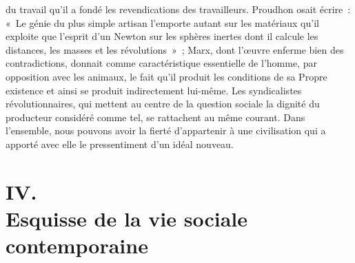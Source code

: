 \documentclass[french,twoside]{book} %
\begin{document}
du travail qu'il a fondé les revendications des travailleurs. Proudhon osait écrire : « Le génie du plus simple artisan l'emporte autant sur les matériaux qu'il exploite que l'esprit d'un Newton sur les sphères inertes dont il calcule les distances, les masses et les révolutions » ; Marx, dont l'œuvre enferme bien des contradictions, donnait comme caractéristique essentielle de l'homme, par opposition avec les animaux, le fait qu'il produit les conditions de sa Propre existence et ainsi se produit indirectement lui-même. Les syndicalistes révolutionnaires, qui mettent au centre de la question sociale la dignité du producteur considéré comme tel, se rattachent au même courant. Dans l'ensemble, nous pouvons avoir la fierté d'appartenir à une civilisation qui a apporté avec elle le pressentiment d'un idéal nouveau.\par

\section[IV. Esquisse de la vie sociale contemporaine]{IV. \\
Esquisse de la vie sociale contemporaine}\renewcommand{\leftmark}{IV. \\
Esquisse de la vie sociale contemporaine}
\end{document}
